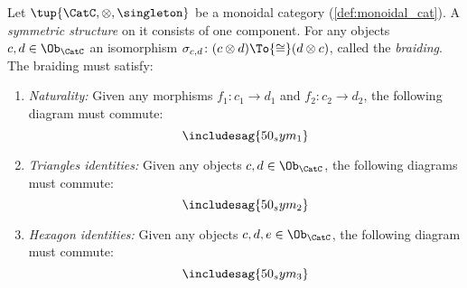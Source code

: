 \begin{shaded}
\begin{definition}
Let $\tup{\CatC,\otimes,\singleton}$ be a monoidal category (\cref{def:monoidal_cat}). A \emph{symmetric structure} on it consists of one component. For any objects $c,d\in\Ob_\CatC$ an isomorphism $\sigma_{c,d}\colon (c\otimes d)\To{\cong}(d\otimes c)$, called the \emph{braiding}. The braiding must satisfy:
\begin{enumerate}
	\item \emph{Naturality:} Given any morphisms $f_1\colon c_1\to d_1$ and $f_2\colon c_2\to d_2$, the following diagram must commute:
	\begin{equation}
	\includesag{50_sym_1}
	\end{equation}
	\item \emph{Triangles identities:} Given any objects $c,d\in\Ob_\CatC$, the following diagrams must commute:
\begin{equation}
	\includesag{50_sym_2}
\end{equation}
\item \emph{Hexagon identities:} Given any objects $c,d,e\in \Ob_\CatC$, the following diagram must commute:
\begin{equation}
    \includesag{50_sym_3}
\end{equation}
\end{enumerate}
\end{definition}


\end{shaded}
